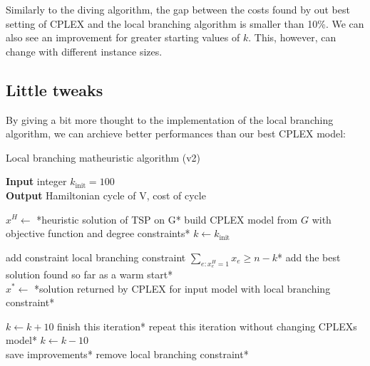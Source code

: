 Similarly to the diving algorithm, the gap between the costs found by out best setting of CPLEX and the local branching algorithm is smaller than 10\%. We can also see an improvement for greater starting values of $k$. This, however, can change with different instance sizes.

\subsection{Little tweaks}
By giving a bit more thought to the implementation of the local branching algorithm, we can archieve better performances than our best CPLEX model:

\begin{algorithm}[h]
    \caption{Local branching matheuristic algorithm (v2)}
    \hspace*{\algorithmicindent} \textbf{Input} integer $k_{\text{init}} = 100$\\
    \hspace*{\algorithmicindent} \textbf{Output} Hamiltonian cycle of V, cost of cycle\\
    \begin{algorithmic}

        \State $x^H \gets$ *heuristic solution of TSP on G*
        \State *build CPLEX model from $G$ with objective function and degree constraints*
        \State $k\gets k_{\text{init}}$\\


                \State *add constraint local branching constraint $\sum_{e:x_e^H=1}x_e\geq n-k$*
                \State *add the best solution found so far as a warm start*
            \EndIf\\

            \State $x^*\gets$ *solution returned by CPLEX for input model with local branching constraint*\\


                    \State $k\gets k+10$
                    \State *finish this iteration*
                \Else
                    \State *repeat this iteration without changing CPLEXs model*
                \EndIf
            \Else
                    \State $k\gets k-10$
                \EndIf
            \EndIf\\

            \State *save improvements*
            \State *remove local branching constraint*

        \EndWhile

    \end{algorithmic}
\end{algorithm}

